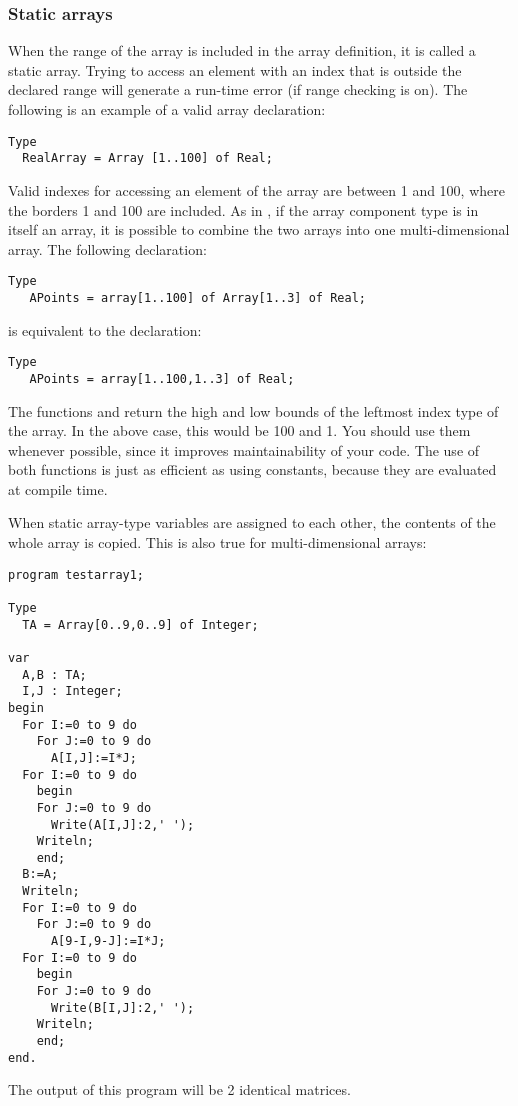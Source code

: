 \subsubsection{Static arrays}
 
When the range of the array is included in the array definition, it is
called a static array. Trying to access an element with an index that is
outside the declared range will generate a run-time error (if range checking
is on).  The following is an example of a valid array declaration:
\begin{verbatim}
Type
  RealArray = Array [1..100] of Real;
\end{verbatim}
Valid indexes for accessing an element of the array are between 1 and 100,
where the borders 1 and 100 are included.
As in \tp, if the array component type is in itself an array, it is
possible to combine the two arrays into one multi-dimensional array. The
following declaration:
\begin{verbatim}
Type
   APoints = array[1..100] of Array[1..3] of Real;
\end{verbatim}
is equivalent to the declaration:
\begin{verbatim}
Type
   APoints = array[1..100,1..3] of Real;
\end{verbatim}
The functions  and  return the high and low bounds of
the leftmost index type of the array. In the above case, this would be 100
and 1. You should use them whenever possible, since it improves maintainability
of your code. The use of both functions is just as efficient as using
constants, because they are evaluated at compile time.

When static array-type variables are assigned to each other, the contents of the
whole array is copied. This is also true for multi-dimensional arrays:
\begin{verbatim}
program testarray1;

Type
  TA = Array[0..9,0..9] of Integer;
  
var   
  A,B : TA;
  I,J : Integer;
begin
  For I:=0 to 9 do
    For J:=0 to 9 do 
      A[I,J]:=I*J;
  For I:=0 to 9 do
    begin
    For J:=0 to 9 do 
      Write(A[I,J]:2,' ');
    Writeln;
    end;
  B:=A;
  Writeln;
  For I:=0 to 9 do
    For J:=0 to 9 do 
      A[9-I,9-J]:=I*J;
  For I:=0 to 9 do
    begin
    For J:=0 to 9 do 
      Write(B[I,J]:2,' ');
    Writeln;
    end;
end.  
\end{verbatim}
The output of this program will be 2 identical matrices.

